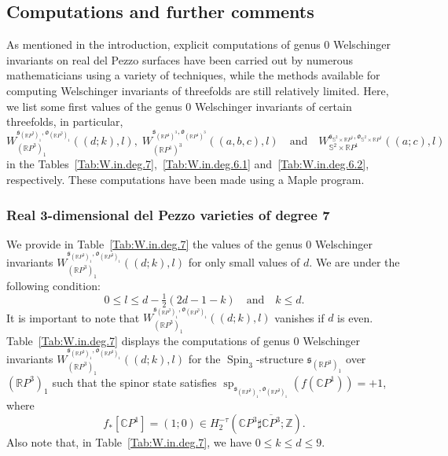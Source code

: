 \documentclass[11pt]{amsart}
\numberwithin{equation}{section}
\theoremstyle{definition}
\theoremstyle{plain}
\theoremstyle{remark}
\newcommand{\R}{\mathbb{R}}
\newcommand{\Z}{\mathbb{Z}}
\newcommand{\C}{\mathbb{C}}
\DeclareMathOperator{\Spin}{Spin}
\renewcommand{\sp}{\operatorname{sp}}
\begin{document}
\subsection{Computations and further comments}

As mentioned in the introduction, explicit computations of genus $0$ Welschinger invariants on real del Pezzo surfaces have been carried out by numerous mathematicians using a variety of techniques, while the methods available for computing Welschinger invariants of threefolds are still relatively limited. Here, we list some first values of the genus $0$ Welschinger invariants of certain threefolds, in particular, 
$$W_{(\R P^3)_1}^{\mathfrak{s}_{(\R P^3)_1}, \mathfrak{o}_{(\R P^3)_1}}((d;k),l), \; W_{(\R P^1)^3}^{\mathfrak{s}_{(\R P^1)^3}, \mathfrak{o}_{(\R P^1)^3}}((a,b,c),l) \quad\text{and}\quad W_{\mathbb{S}^2\times \R P^1}^{\mathfrak{s}_{\mathbb{S}^2\times \R P^1},\mathfrak{o}_{\mathbb{S}^2\times \R P^1}}((a;c),l)$$  in the Tables~\ref{Tab:W.in.deg.7},~\ref{Tab:W.in.deg.6.1} and~\ref{Tab:W.in.deg.6.2}, respectively. These computations have been made using a Maple program.

\subsubsection{Real 3-dimensional del Pezzo varieties of degree 7}
We provide in Table~\ref{Tab:W.in.deg.7} the values of the genus $0$ Welschinger invariants $W_{(\R P^3)_1}^{\mathfrak{s}_{(\R P^3)_1},\mathfrak{o}_{(\R P^3)_1}}((d;k),l)$ for only small values of $d$. We  are under the following condition: $$0\leq l \leq d-\tfrac{1}{2}(2d-1-k) \quad\text{and}\quad k\leq d.$$ 
It is important to note that 
$W_{(\R P^3)_1}^{\mathfrak{s}_{(\R P^3)_1},\mathfrak{o}_{(\R P^3)_1}}((d;k),l)$ vanishes if $d$ is even. Table~\ref{Tab:W.in.deg.7} displays the computations of  genus $0$ Welschinger invariants $W_{(\R P^3)_1}^{\mathfrak{s}_{(\R P^3)_1},\mathfrak{o}_{(\R P^3)_1}}((d;k),l)$ for the $\Spin_3$-structure $\mathfrak{s}_{(\R P^3)_1}$ over $(\R P^3)_1$  such that the spinor state satisfies $\sp_{\mathfrak{s}_{(\R P^3)_1},\mathfrak{o}_{(\R P^3)_1}}(f(\C P^1))=+1$, where $$f_*[\C P^1]=(1;0)\in H_2^{-\tau}(\C P^3\sharp \overline{\C P^3};\Z).$$ 
 Also note that, in Table~\ref{Tab:W.in.deg.7}, we have $0 \leq k\leq d\leq 9$.
\end{document}
